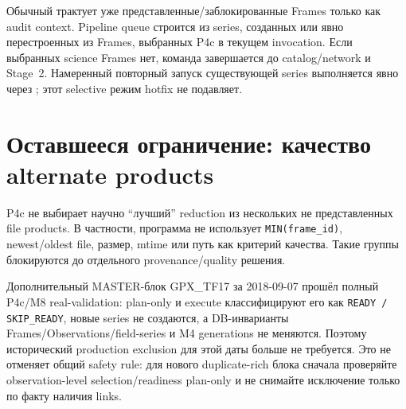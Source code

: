 Обычный  трактует уже представленные/заблокированные Frames только как audit context. Pipeline queue строится из series, созданных или явно перестроенных из Frames, выбранных P4c в текущем invocation. Если выбранных science Frames нет, команда завершается до catalog/network и Stage~2. Намеренный повторный запуск существующей series выполняется явно через ; этот selective режим hotfix не подавляет.

\section{Оставшееся ограничение: качество alternate products}

P4c не выбирает научно ``лучший'' reduction из нескольких не представленных file products. В частности, программа не использует \texttt{MIN(frame\_id)}, newest/oldest file, размер, mtime или путь как критерий качества. Такие группы блокируются до отдельного provenance/quality решения.

Дополнительный MASTER-блок GPX\_TF17 за 2018-09-07 прошёл полный P4c/M8 real-validation: plan-only и execute классифицируют его как \texttt{READY / SKIP\_READY}, новые series не создаются, а DB-инварианты Frames/Observations/field-series и M4 generations не меняются. Поэтому исторический production exclusion для этой даты больше не требуется. Это не отменяет общий safety rule: для нового duplicate-rich блока сначала проверяйте observation-level selection/readiness plan-only и не снимайте исключение только по факту наличия links.
